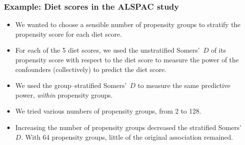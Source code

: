 \documentclass[11pt]{beamer}
\begin{document}
\begin{frame}
\frametitle{Example: Diet scores in the ALSPAC study}

\begin{itemize}

\item<2-> We wanted to choose a sensible number of propensity groups
to stratify the propensity score for each diet score.

\item<3-> For each of the 5 diet scores,
we used the unstratified Somers'~$D$ of its propensity score with respect to the diet score
to measure the power of the confounders (collectively) to predict the diet score.

\item<4-> We used the group--stratified Somers'~$D$ to measure the same predictive power,
\textit{within} propensity groups.

\item<5-> We tried various numbers of propensity groups, from 2 to 128.

\item<6-> Increasing the number of propensity groups decreased the stratified Somers'~$D$.
With 64 propensity groups, little of the original association remained.

\end{itemize}

\end{frame}
\end{document}
